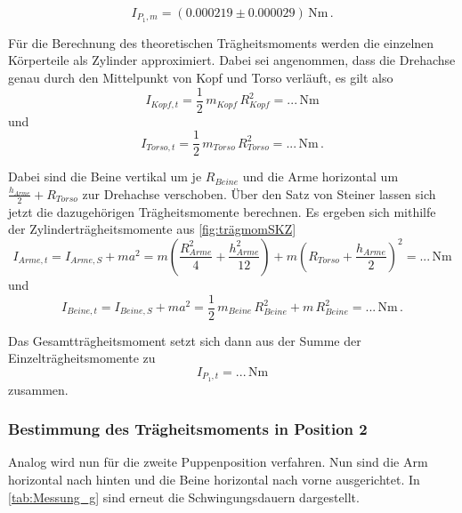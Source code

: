 \begin{equation*}
  I_{P_1,m} = (0.000219 \pm 0.000029) \, \unit{\newton\meter} \,.
\end{equation*}

Für die Berechnung des theoretischen Trägheitsmoments werden die einzelnen Körperteile als Zylinder approximiert. Dabei sei angenommen, dass die Drehachse genau durch den Mittelpunkt von Kopf und Torso verläuft, es gilt also
\begin{equation*}
  I_{Kopf,t} = \frac{1}{2} \, m_{Kopf} \, R^2_{Kopf} = ... \, \unit{\newton\meter}
\end{equation*}
und
\begin{equation*}
  I_{Torso,t} = \frac{1}{2} \, m_{Torso} \, R^2_{Torso} = ... \, \unit{\newton\meter} \,.
\end{equation*}

Dabei sind die Beine vertikal um je $R_{Beine}$ und die Arme horizontal um $\frac{h_{Arme}}{2} + R_{Torso}$ zur Drehachse verschoben. 
Über den Satz von Steiner lassen sich jetzt die dazugehörigen Trägheitsmomente berechnen.
Es ergeben sich mithilfe der Zylinderträgheitsmomente aus \autoref{fig:trägmomSKZ}
\begin{equation*}
  I_{Arme,t} = I_{Arme,S} + m a^2 = m \left(\frac{R^2_{Arme}}{4} + \frac{h^2_{Arme}}{12} \right) + m \left(R_{Torso} + \frac{h_{Arme}}{2} \right)^2 = ... \, \unit{\newton\meter}
\end{equation*}
und
\begin{equation*}
  I_{Beine,t} = I_{Beine,S} + m a^2 = \frac{1}{2} \, m_{Beine} \, R^2_{Beine} + m \, R^2_{Beine} = ... \, \unit{\newton\meter} \,.
\end{equation*}

Das Gesamtträgheitsmoment setzt sich dann aus der Summe der Einzelträgheitsmomente zu
\begin{equation*}
  I_{P_1,t} = ... \, \unit{\newton\meter}
\end{equation*}
zusammen.

\subsubsection{Bestimmung des Trägheitsmoments in Position 2}
\label{subsubsec:pos2}

Analog wird nun für die zweite Puppenposition verfahren. 
Nun sind die Arm horizontal nach hinten und die Beine horizontal nach vorne ausgerichtet. 
In \autoref{tab:Messung_g} sind erneut die Schwingungsdauern dargestellt.


